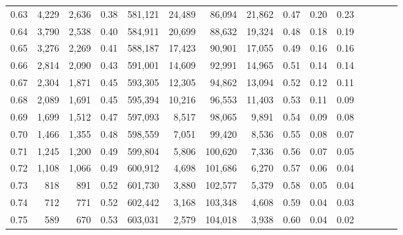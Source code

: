 \begin{tabular}{rrrcrrrrrrrrrrr}
0.63 &   4,229 &  2,636 &                                       0.38 &  581,121 &   24,489 &   86,094 &   21,862 &  0.47 &  0.20 &                         0.23 \\
0.64 &   3,790 &  2,538 &                                       0.40 &  584,911 &   20,699 &   88,632 &   19,324 &  0.48 &  0.18 &                         0.19 \\
0.65 &   3,276 &  2,269 &                                       0.41 &  588,187 &   17,423 &   90,901 &   17,055 &  0.49 &  0.16 &                         0.16 \\
0.66 &   2,814 &  2,090 &                                       0.43 &  591,001 &   14,609 &   92,991 &   14,965 &  0.51 &  0.14 &                         0.14 \\
0.67 &   2,304 &  1,871 &                                       0.45 &  593,305 &   12,305 &   94,862 &   13,094 &  0.52 &  0.12 &                         0.11 \\
0.68 &   2,089 &  1,691 &                                       0.45 &  595,394 &   10,216 &   96,553 &   11,403 &  0.53 &  0.11 &                         0.09 \\
0.69 &   1,699 &  1,512 &                                       0.47 &  597,093 &    8,517 &   98,065 &    9,891 &  0.54 &  0.09 &                         0.08 \\
0.70 &   1,466 &  1,355 &                                       0.48 &  598,559 &    7,051 &   99,420 &    8,536 &  0.55 &  0.08 &                         0.07 \\
0.71 &   1,245 &  1,200 &                                       0.49 &  599,804 &    5,806 &  100,620 &    7,336 &  0.56 &  0.07 &                         0.05 \\
0.72 &   1,108 &  1,066 &                                       0.49 &  600,912 &    4,698 &  101,686 &    6,270 &  0.57 &  0.06 &                         0.04 \\
0.73 &     818 &    891 &                                       0.52 &  601,730 &    3,880 &  102,577 &    5,379 &  0.58 &  0.05 &                         0.04 \\
0.74 &     712 &    771 &                                       0.52 &  602,442 &    3,168 &  103,348 &    4,608 &  0.59 &  0.04 &                         0.03 \\
0.75 &     589 &    670 &                                       0.53 &  603,031 &    2,579 &  104,018 &    3,938 &  0.60 &  0.04 &                         0.02 \\

\end{tabular}
